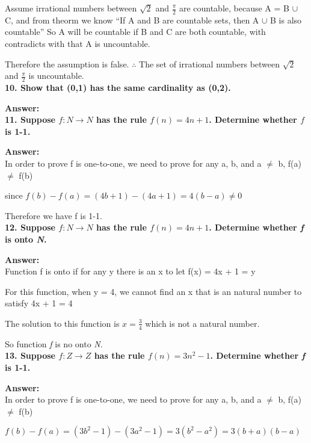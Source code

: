 \documentclass{article}
\begin{document}
\begin{large}
Assume irrational numbers between $\sqrt{2}$ and $\frac{\pi}{2}$ are countable, 
because A = B $\cup$ C, and from theorm we know ``If A and B are countable sets, then A $\cup$ B is also countable''
So A will be countable if B and C are both countable, with contradicts with that A is uncountable.

Therefore the assumption is false. 
$\therefore$ The set of irrational numbers between $\sqrt{2}$ and $\frac{\pi}{2}$ is uncountable.\\


\textbf{10. Show that (0,1) has the same cardinality as (0,2).}

\textbf{Answer:} \\



\textbf{11. Suppose $f:N\to N$ has the rule $f(n)=4n+1$. Determine whether $f$ is 1-1.}

\textbf{Answer:} \\

In order to prove f is one-to-one, we need to prove for any a, b, and a $\neq$ b, f(a) $\neq$ f(b)

since $f(b) - f(a) = (4b + 1) - (4a + 1) = 4(b-a) \neq 0$

Therefore we have f is 1-1.\\


\textbf{12. Suppose $f:N\to N$ has the rule $f(n)=4n+1$. Determine whether \emph{f} is onto \emph{N}.}

\textbf{Answer:} \\

Function f is onto if for any y there is an x to let f(x) = 4x + 1 = y

For this function, when y = 4, we cannot find an x that is an natural number to satisfy 4x + 1 = 4

The solution to this function is $x = \frac{3}{4}$ which is not a natural number.

So function \emph{f} is no onto \emph{N}.\\

\textbf{13. Suppose $f:Z\to Z$ has the rule $f(n)=3{n^{2}}-1$. Determine whether \emph{f} is 1-1.}

\textbf{Answer:} \\

In order to prove f is one-to-one, we need to prove for any a, b, and a $\neq$ b, f(a) $\neq$ f(b)

$f(b) - f(a) = (3b^2 - 1) - (3a^2 - 1) = 3(b^2 - a^2) = 3(b + a)(b - a)$


\end{large}
\end{document}
